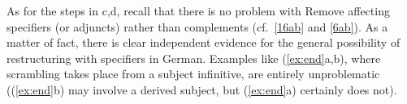 \documentclass[output=paper]{langsci/langscibook}
\begin{document}

As for the steps in c,d, recall that there is no problem with
Remove affecting specifiers (or adjuncts) rather than complements (cf.\
\eqref{16ab} and \eqref{6ab}). As a matter of fact, there is clear independent
evidence for the general possibility of restructuring with specifiers in
German.  Examples like (\ref{ex:end}a,b), where scrambling takes place from a
subject infinitive, are entirely unproblematic ((\ref{ex:end}b) may involve a
derived subject, but (\ref{ex:end}a) certainly does not).
\end{document}
